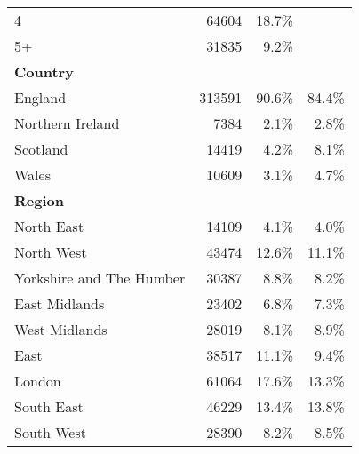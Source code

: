 \begin{tabular}{lrrr}
4 & 64604 & 18.7\% &  \\
5+ & 31835 & 9.2\% &  \\
\hline
\multicolumn{4}{l}{\textbf{Country}} \\
England & 313591 & 90.6\% & 84.4\% \\
Northern Ireland & 7384 & 2.1\% & 2.8\% \\
Scotland & 14419 & 4.2\% & 8.1\% \\
Wales & 10609 & 3.1\% & 4.7\% \\
\hline
\multicolumn{4}{l}{\textbf{Region}} \\
North East & 14109 & 4.1\% & 4.0\% \\
North West & 43474 & 12.6\% & 11.1\% \\
Yorkshire and The Humber & 30387 & 8.8\% & 8.2\% \\
East Midlands & 23402 & 6.8\% & 7.3\% \\
West Midlands & 28019 & 8.1\% & 8.9\% \\
East & 38517 & 11.1\% & 9.4\% \\
London & 61064 & 17.6\% & 13.3\% \\
South East & 46229 & 13.4\% & 13.8\% \\
South West & 28390 & 8.2\% & 8.5\% \\
\hline
\end{tabular}


